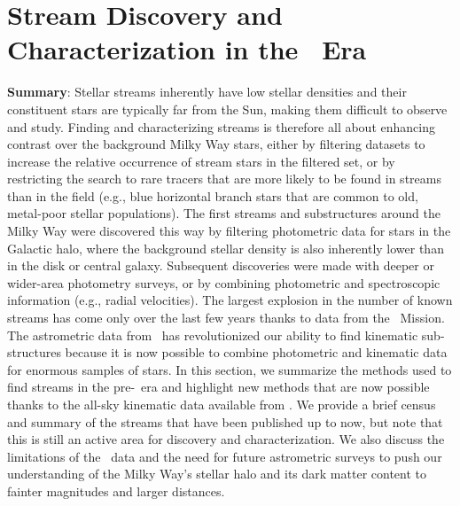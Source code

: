 \documentclass[final,5p,times,twocolumn,authoryear]{elsarticle}
\begin{document}
\section{Stream Discovery and Characterization in the \gaia\ Era}
\label{sec:discovery}


\textbf{Summary}: Stellar streams inherently have low stellar densities and their
constituent stars are typically far from the Sun, making them difficult to observe and
study.
Finding and characterizing streams is therefore all about enhancing contrast over the
background Milky Way stars, either by filtering datasets to increase the relative
occurrence of stream stars in the filtered set, or by restricting the search to rare
tracers that are more likely to be found in streams than in the field (e.g., blue
horizontal branch stars that are common to old, metal-poor stellar populations).
The first streams and substructures around the Milky Way were discovered this way by
filtering photometric data for stars in the Galactic halo, where the background stellar
density is also inherently lower than in the disk or central galaxy.
Subsequent discoveries were made with deeper or wider-area photometry surveys, or by
combining photometric and spectroscopic information (e.g., radial velocities).
The largest explosion in the number of known streams has come only over the last few
years thanks to data from the \gaia\ Mission.
The astrometric data from \gaia\ has revolutionized our ability to find kinematic
sub-structures because it is now possible to combine photometric and kinematic data for
enormous samples of stars.
In this section, we summarize the methods used to find streams in the pre-\gaia\ era and
highlight new methods that are now possible thanks to the all-sky kinematic data
available from \gaia.
We provide a brief census and summary of the streams that have been published up to now,
but note that this is still an active area for discovery and characterization.
We also discuss the limitations of the \gaia\ data and the need for future astrometric
surveys to push our understanding of the Milky Way's stellar halo and its dark matter
content to fainter magnitudes and larger distances.
\end{document}
